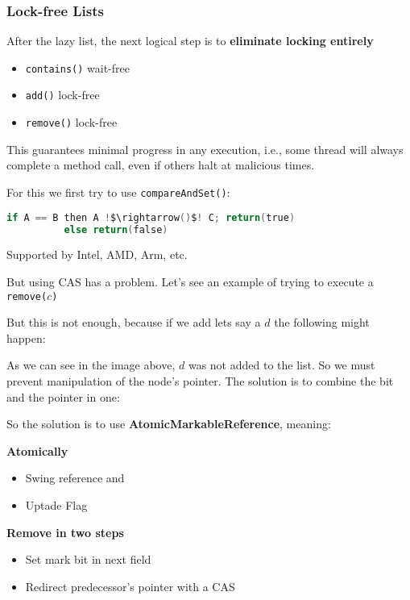 \subsubsection{Lock-free Lists}
\par After the lazy list, the next logical step is to \textbf{eliminate locking entirely}
\begin{itemize}
    \item \texttt{contains()} wait-free
    \item \texttt{add()} lock-free
    \item \texttt{remove()} lock-free
\end{itemize}
\par This guarantees minimal progress in any execution, i.e., some thread will always complete a method call, even if others halt at malicious times. %
\par For this we first try to use \texttt{compareAndSet()}:
\begin{tcolorbox}[colback=nightblue!5!white, colframe=nightblue!75!black]
\begin{center}
    \begin{lstlisting}[label={lst:lockfree1}, language=C, morekeywords={}, escapechar=!, numbers=none]
if A == B then A !$\rightarrow()$! C; return(true)
          else return(false)
    \end{lstlisting}
    \par Supported by Intel, AMD, Arm, etc.
\end{center}
\end{tcolorbox}
%
\clearpage
%
\par But using CAS has a problem. Let's see an example of trying to execute a \texttt{remove($c$)}
\par But this is not enough, because if we add lets say a $d$ the following might happen:
\par As we can see in the image above, $d$ was not added to the list. So we must prevent manipulation of the node's pointer. The solution is to combine the bit and the pointer in one:
\par So the solution is to use \textbf{AtomicMarkableReference}, meaning:
\begin{multicols}{2}
    \par \textbf{Atomically}
    \begin{itemize}
        \item Swing reference and
        \item Uptade Flag
    \end{itemize}
    \par \textbf{Remove in two steps}
    \begin{itemize}
        \item Set mark bit in next field
        \item Redirect predecessor’s pointer with a CAS
    \end{itemize}
\end{multicols}
